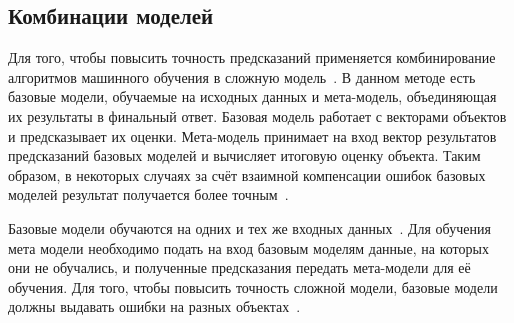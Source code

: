 \subsection{Комбинации моделей}
Для того, чтобы повысить точность предсказаний применяется комбинирование алгоритмов машинного обучения в сложную модель~\cite{dietterich2000ensemble}.
В данном методе есть базовые модели, обучаемые на исходных данных и мета-модель, объединяющая их результаты в финальный ответ.
Базовая модель работает с векторами объектов и предсказывает их оценки.
Мета-модель принимает на вход вектор результатов предсказаний базовых моделей и вычисляет итоговую оценку объекта.
Таким образом, в некоторых случаях за счёт взаимной компенсации ошибок базовых моделей результат получается более точным~\cite{dietterich2000ensemble}.

Базовые модели обучаются на одних и тех же входных данных~\cite{dietterich2000ensemble}.
Для обучения мета модели необходимо подать на вход базовым моделям данные, на которых они не обучались, и полученные предсказания передать мета-модели для её обучения.
Для того, чтобы повысить точность сложной модели, базовые модели должны выдавать ошибки на разных объектах~\cite{dietterich2000ensemble}.